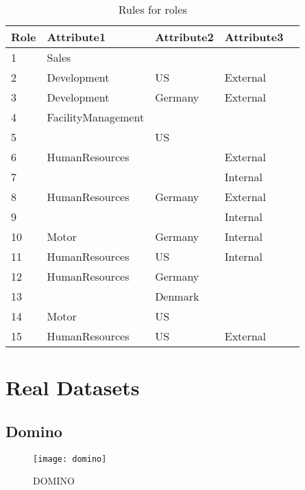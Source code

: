 		\begin{table}[H]
			\centering
			\caption{Rules for roles}
			\label{tab:dataset2_rules}
			\begin{tabular}{|l|l|l|l|l|}
				\hline
				\rowcolor[HTML]{EFEFEF} 
				Role & Attribute1         & Attribute2 & Attribute3   \\ \hline
				1    & Sales              &            &              \\ \hline
				2    & Development        & US         & External     \\ \hline
				3    & Development        & Germany    & External     \\ \hline
				4    & FacilityManagement &            &              \\ \hline
				5    &                    & US         &              \\ \hline
				6    & HumanResources     &            & External     \\ \hline
				7    &                    &            & Internal     \\ \hline
				8    & HumanResources     & Germany    & External     \\ \hline
				9    &                    &            & Internal     \\ \hline
				10   & Motor              & Germany    & Internal     \\ \hline
				11   & HumanResources     & US         & Internal     \\ \hline
				12   & HumanResources     & Germany    &              \\ \hline
				13   &                    & Denmark    &              \\ \hline
				14   & Motor              & US         &              \\ \hline
				15   & HumanResources     & US         & External     \\ \hline
			\end{tabular}
		\end{table}

\section{Real Datasets}
\label{sec:A_real_datasets}
	\subsection{Domino}
		\begin{figure}[H]
			\centering
			\texttt{[image: domino]}
			\caption{DOMINO}
			\label{fig:domino}
		\end{figure}
